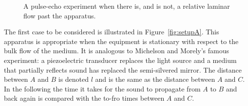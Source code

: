 \documentclass[10pt, fleqn,final,showtrims,oldfontcommands]{article} %
\newcommand{\secref}[1]{section~\ref{sec:#1}}
\newcommand{\figref}[1]{Figure~\ref{fig:#1}}
\newcommand{\tm}{\tau^-}
\newcommand{\tp}{\tau^+}
\begin{document}









 \begin{figure}[t]
      \centering
\hfill
\label{fig:setups}
      \caption{A pulse-echo experiment when there is, and is not, a relative laminar flow past the apparatus.}
 \end{figure}
The first case to be considered is illustrated in \figref{setupA}.
This apparatus is appropriate when the equipment is stationary with respect to the bulk flow of the medium.
It is  analogous to  Michelson and Morely's famous experiment:
a piezoelectric transducer  replaces the light source and a medium that partially reflects sound has replaced the semi-silvered mirror.
The distance between $A$ and $B$ is denoted $l$ and is the same  as the distance between $A$ and $C$.
In the following the time it takes for the sound to propagate from $A$ to $B$ and back again is compared with the to-fro times between $A$ and $C$.
\end{document}
